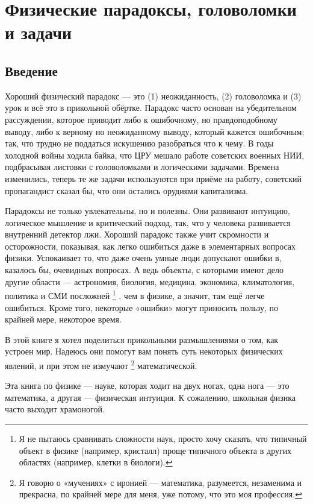 \chapter[Парадоксы, головоломки, задачи]{Физические парадоксы, головоломки и задачи}

\section{Введение}

Хороший физический парадокс --- это (1) неожиданность, (2) головоломка и (3) урок и всё это в прикольной обёртке.
Парадокс часто основан на убедительном рассуждении, которое приводит либо к ошибочному, но правдоподобному выводу, либо к верному но неожиданному выводу, который кажется ошибочным;
так, что трудно не поддаться искушению разобраться что к чему.
В годы холодной войны ходила байка, что ЦРУ мешало работе советских военных НИИ, подбрасывая листовки с головоломками и логическими задачами.
Времена изменились, теперь те же задачи используются при приёме на работу, советский пропагандист сказал бы, что они остались орудиями капитализма.

Парадоксы не только увлекательны, но и полезны.
Они развивают интуицию, логическое мышление и критический подход, так, что
у человека развивается внутренний детектор лжи.
Хороший парадокс также учит скромности и осторожности, показывая, как легко ошибиться даже в элементарных вопросах физики.
Успокаивает то, что даже очень умные люди допускают ошибки в, казалось бы, очевидных вопросах.
А ведь объекты, с которыми имеют дело другие области --- астрономия, биология, медицина, экономика, климатология, политика и СМИ посложней%
\footnote{Я не пытаюсь сравнивать сложности наук, просто хочу сказать, что типичный объект в физике (например, кристалл) проще типичного объекта в других областях (например, клетки в биологи).}%
, чем в физике, а значит, там ещё легче ошибиться.
Кроме того, некоторые «ошибки» могут приносить пользу, по крайней мере, некоторое время.

В этой книге я хотел поделиться прикольными размышлениями о том, как устроен мир.
Надеюсь они помогут вам понять суть некоторых физических явлений, и при этом не измучают%
\footnote{Я говорю о «мучениях» с иронией --- математика, разумеется, незаменима и прекрасна, по крайней мере для меня, уже потому, что это моя профессия.}
математической.

Эта книга по физике — науке, которая ходит на двух ногах, одна нога --- это математика, а другая --- физическая интуиция.
К сожалению, школьная физика часто выходит храмоногой.

